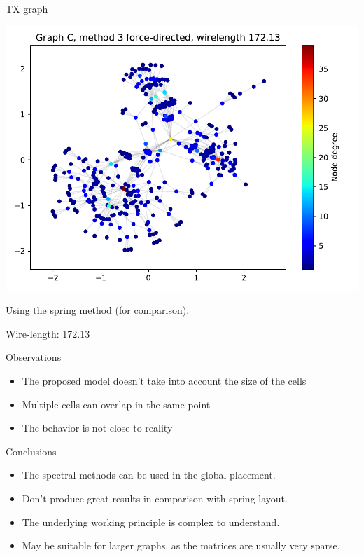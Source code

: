 \documentclass[serif, 12pt]{beamer}
\begin{document}
\begin{frame}{TX graph}
\begin{center}
\includegraphics[scale=0.5]{C/spring.pdf}
\end{center}
Using the spring method (for comparison).

Wire-length: 172.13
\end{frame}

\begin{frame}{Observations}

\begin{itemize}

\item The proposed model doesn't take into account the size of the cells
\item Multiple cells can overlap in the same point
\item The behavior is not close to reality

\end{itemize}
\end{frame}

\begin{frame}{Conclusions}

\begin{itemize}

\item The spectral methods can be used in the global placement.
\item Don't produce great results in comparison with spring layout.
\item The underlying working principle is complex to understand.
\item May be suitable for larger graphs, as the matrices are usually very 
sparse.

\end{itemize}

\end{frame}
\end{document}
